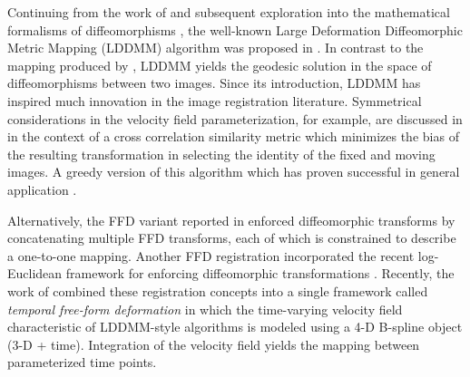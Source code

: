 \documentclass{frontiersSCNS}
\begin{document}
Continuing from the work of \cite{christensen1996} and subsequent exploration into the mathematical formalisms of diffeomorphisms \citep[e.g.][]{dupuis1998}, 
the well-known Large Deformation Diffeomorphic Metric Mapping (LDDMM) algorithm  
was proposed in \cite{Beg2005}.  In contrast to the mapping produced
by \cite{christensen1996}, LDDMM yields the geodesic solution in the space of diffeomorphisms between two images. Since its introduction, LDDMM has
inspired much innovation in the image registration literature.  
Symmetrical considerations in the velocity field parameterization, for example, are discussed in \cite{avants2008} in the context of a cross correlation similarity metric which minimizes the bias of the resulting transformation in selecting the identity of the fixed and moving images.  A greedy version of this algorithm which has proven successful in general application \citep{Klein2009}.




Alternatively, the FFD 
variant reported in \cite{rueckert2006} enforced diffeomorphic transforms
by concatenating multiple FFD transforms, each of which is constrained
to describe a one-to-one mapping.  Another FFD registration
incorporated the recent log-Euclidean framework for enforcing diffeomorphic
transformations \cite{Modat2011}.
Recently, the work of 
\cite{de-craene2011} combined these registration concepts into a single
framework called {\em temporal free-form deformation} in which the 
time-varying velocity field characteristic of LDDMM-style algorithms
is modeled using a 4-D B-spline object (3-D + time).  Integration of 
the velocity field yields the mapping between parameterized time points.
\end{document}
